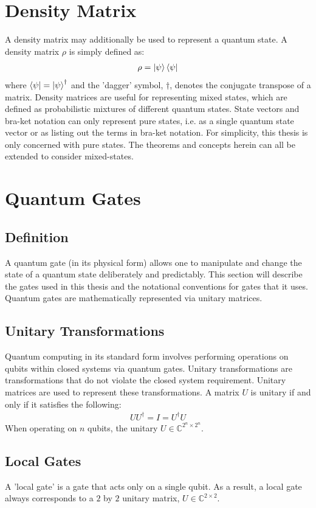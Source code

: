 \section{Density Matrix}
A density matrix may additionally be used to represent a quantum state. A density matrix $\rho$ is simply defined as:
\begin{align}
\rho = \ket{\psi} \bra{\psi}
\end{align}
where $\bra{\psi} = \ket{\psi}^{\dagger}$ and the 'dagger' symbol, $\dagger$, denotes the conjugate transpose of a matrix. Density matrices are useful for representing mixed states, which are defined as probabilistic mixtures of different quantum states. State vectors and bra-ket notation can only represent pure states, i.e. as a single quantum state vector or as listing out the terms in bra-ket notation. For simplicity, this thesis is only concerned with pure states. The theorems and concepts herein can all be extended to consider mixed-states.

\section{Quantum Gates}
\subsection{Definition}
A quantum gate (in its physical form) allows one to manipulate and change the state of a quantum state deliberately and predictably. This section will describe the gates used in this thesis and the notational conventions for gates that it uses. Quantum gates are mathematically represented via unitary matrices.
\subsection{Unitary Transformations}
Quantum computing in its standard form involves performing operations on qubits within closed systems via quantum gates. Unitary transformations are transformations that do not violate the closed system requirement. Unitary matrices are used to represent these transformations. A matrix $U$ is unitary if and only if it satisfies the following:
\begin{align}
UU^{\dagger} = I = U^{\dagger}U
\end{align}
When operating on $n$ qubits, the unitary $U \in \mathbb{C}^{2^n \times 2^n}$.
\subsection{Local Gates}
\label{sec:localGate}
A 'local gate' is a gate that acts only on a single qubit. As a result, a local gate always corresponds to a $2$ by $2$ unitary matrix, $U \in \mathbb{C}^{2 \times 2}$.


